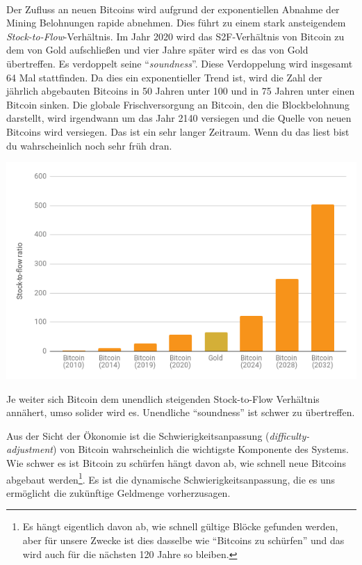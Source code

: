 \paragraph{}
Der Zufluss an neuen Bitcoins wird aufgrund der exponentiellen Abnahme der
Mining Belohnungen rapide abnehmen. Dies führt zu einem stark ansteigendem
\textit{Stock-to-Flow}-Verhältnis. Im Jahr 2020 wird das S2F-Verhältnis von Bitcoin
zu dem von Gold aufschließen und vier Jahre später wird es das von Gold übertreffen. Es
verdoppelt seine \enquote{\textit{soundness}}. Diese Verdoppelung wird insgesamt
64 Mal stattfinden. Da dies ein exponentieller Trend ist, wird die Zahl der
jährlich abgebauten Bitcoins in 50 Jahren unter 100 und in 75 Jahren
unter einen Bitcoin sinken. Die globale Frischversorgung an Bitcoin, den die
Blockbelohnung darstellt, wird irgendwann um das Jahr 2140 versiegen und die
Quelle von neuen Bitcoins wird versiegen. Das ist ein sehr langer Zeitraum. Wenn
du das liest bist du wahrscheinlich noch sehr früh dran.

\begin{center}
  \includegraphics[width=\textwidth]{assets/images/soundness-over-time.png}
  \label{fig:soundness-over-time}
\end{center}

Je weiter sich Bitcoin dem unendlich steigenden Stock-to-Flow Verhältnis
annähert, umso solider wird es. Unendliche \enquote{soundness} ist schwer zu
übertreffen.

Aus der Sicht der Ökonomie ist die Schwierigkeitsanpassung
(\textit{difficulty-adjustment}) von Bitcoin wahrscheinlich die wichtigste
Komponente des Systems. Wie schwer es ist Bitcoin zu schürfen hängt davon ab,
wie schnell neue Bitcoins abgebaut werden\footnote{Es hängt eigentlich davon ab,
wie schnell gültige Blöcke gefunden werden, aber für unsere Zwecke ist dies
dasselbe wie \enquote{Bitcoins zu schürfen} und das wird auch für die nächsten
120 Jahre so bleiben.}. Es ist die dynamische Schwierigkeitsanpassung, die es
uns ermöglicht die zukünftige Geldmenge vorherzusagen.

